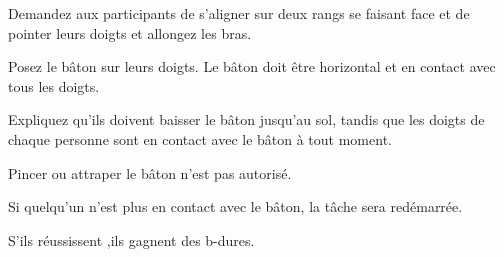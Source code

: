 \documentclass{grand-jeu}
\begin{document}
\begin{liste-materiel}
\end{liste-materiel}

\begin{regles}
Demandez aux participants de s’aligner sur deux rangs se faisant face et de pointer leurs doigts et allongez les bras.

Posez le bâton sur leurs doigts. Le bâton doit être horizontal et en contact avec tous les doigts.

Expliquez qu’ils doivent baisser le bâton jusqu’au sol, tandis que les doigts de chaque personne sont en contact avec le bâton à tout moment.

Pincer ou attraper le bâton n’est pas autorisé.

Si quelqu’un n’est plus en contact avec le bâton, la tâche sera redémarrée.

S'ils réussissent ,ils gagnent des b-dures.
\end{regles}

\begin{moments-stop}
\end{moments-stop}
\end{document}
